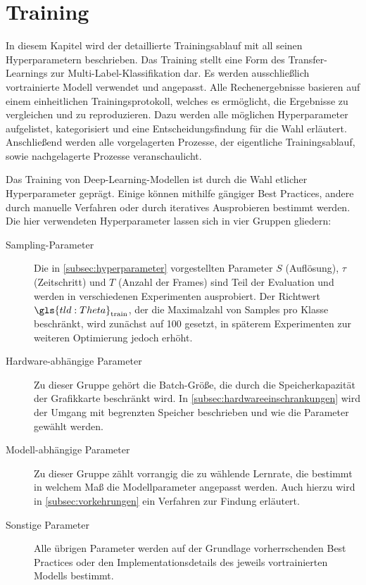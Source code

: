 \chapter{Training}
\label{ch:training}

In diesem Kapitel wird der detaillierte Trainingsablauf mit all seinen Hyperparametern beschrieben.
Das Training stellt eine Form des Transfer-Learnings zur Multi-Label-Klassifikation dar.
Es werden ausschließlich vortrainierte Modell verwendet und angepasst.
Alle Rechenergebnisse basieren auf einem einheitlichen Trainingsprotokoll, welches es ermöglicht, die Ergebnisse zu vergleichen und zu reproduzieren.
Dazu werden alle möglichen Hyperparameter aufgelistet, kategorisiert und eine Entscheidungsfindung für die Wahl erläutert.
Anschließend werden alle vorgelagerten Prozesse, der eigentliche Trainingsablauf, sowie nachgelagerte Prozesse veranschaulicht.

Das Training von Deep-Learning-Modellen ist durch die Wahl etlicher Hyperparameter geprägt.
Einige können mithilfe gängiger Best Practices, andere durch manuelle Verfahren oder durch iteratives Ausprobieren bestimmt werden.
Die hier verwendeten Hyperparameter lassen sich in vier Gruppen gliedern:

\begin{description}
    \item[Sampling-Parameter] Die in \autoref{subsec:hyperparameter} vorgestellten Parameter $S$ (Auflösung), $\tau$ (Zeitschritt) und $T$ (Anzahl der Frames) sind Teil der Evaluation und werden in verschiedenen Experimenten ausprobiert.
    Der Richtwert $\gls{tld:Theta}_\text{train}$, der die Maximalzahl von Samples pro Klasse beschränkt, wird zunächst auf 100 gesetzt, in späterem Experimenten zur weiteren Optimierung jedoch erhöht.
    \item[Hardware-abhängige Parameter]
    Zu dieser Gruppe gehört \zB die Batch-Größe, die durch die Speicherkapazität der Grafikkarte beschränkt wird.
    In \autoref{subsec:hardwareeinschrankungen} wird der Umgang mit begrenzten Speicher beschrieben und wie die Parameter gewählt werden.
    \item[Modell-abhängige Parameter] Zu dieser Gruppe zählt vorrangig die zu wählende Lernrate, die bestimmt in welchem Maß die Modellparameter angepasst werden.
    Auch hierzu wird in \autoref{subsec:vorkehrungen} ein Verfahren zur Findung erläutert.
    \item[Sonstige Parameter] Alle übrigen Parameter werden auf der Grundlage vorherrschenden Best Practices oder den Implementationsdetails des jeweils vortrainierten Modells bestimmt.
\end{description}

